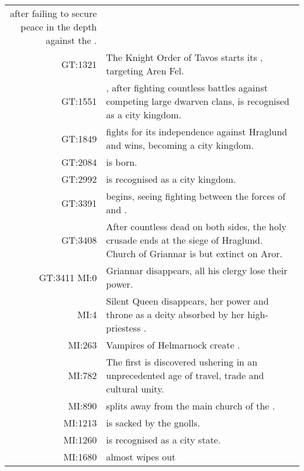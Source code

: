 \begin{longtable}{@{\,}r <{\hskip 6pt} !{
  \color{LightSteelBlue3}
  \makebox[0pt]{\textbullet}
  \hskip -2.6pt
  \vrule width 1pt
  \hspace{\labelsep}
  }
  >{\raggedright\arraybackslash}p{11cm}
}
                       after failing to secure peace in the depth against
                       the . \\
    GT:1321          & The Knight Order of Tavos starts its , targeting Aren Fel. \\
    GT:1551          & , after fighting countless battles
                       against competing large dwarven clans, is recognised as a
                       city kingdom. \\
    GT:1849          &  fights for its independence against
                       Hraglund and wins, becoming a city kingdom. \\
    GT:2084          &  is born. \\
    GT:2992          &  is recognised as a city kingdom. \\
    GT:3391          &  begins, seeing fighting
                       between the forces of  and
                       . \\
    GT:3408          & After countless dead on both sides, the holy crusade ends
                       at the siege of Hraglund. Church of Griannar is but
                       extinct on Aror. \\
    GT:3411 MI:0     & Griannar disappears, all his clergy lose their power. \\
    MI:4             & Silent Queen disappears, her power and throne as a deity
                       absorbed by her high-priestess . \\
    MI:263           & Vampires of Helmarnock create . \\
    MI:782           & The first  is discovered
                       ushering in an unprecedented age of travel, trade and
                       cultural unity. \\
    MI:890           &  splits away from the
                       main church of the . \\
    MI:1213          &  is sacked by the gnolls. \\
    MI:1260          &  is recognised as a city state. \\
    MI:1680          &  almost wipes out

\end{longtable}
